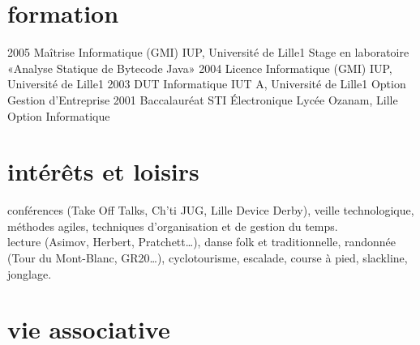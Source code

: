 \documentclass[print]{cv} %
\begin{document}
\section{formation}

\begin{entrylist}
\entry
{2005}
{Maîtrise {\normalfont Informatique (GMI)}}
{IUP, Université de Lille1}
{Stage en laboratoire «Analyse Statique de Bytecode Java»}
\entry
{2004}
{Licence {\normalfont Informatique (GMI)}}
{IUP, Université de Lille1}
{}
\entry
{2003}
{DUT {\normalfont Informatique}}
{IUT A, Université de Lille1}
{Option Gestion d'Entreprise}
\entry
{2001}
{Baccalauréat {\normalfont STI Électronique}}
{Lycée Ozanam, Lille}
{Option Informatique}
\end{entrylist}

\par\vspace{5\parskip}
\section{intérêts et loisirs}

\textbf{} conférences (Take Off Talks, Ch'ti JUG, Lille Device Derby), veille technologique, méthodes agiles, techniques d'organisation et de gestion du temps.
\vspace{10pt}\\
\textbf{} lecture (Asimov, Herbert, Pratchett…), danse folk et traditionnelle, randonnée (Tour du Mont-Blanc, GR20…), cyclotourisme, escalade, course à pied, slackline, jonglage.

\par\vspace{50\parskip}
\section{vie associative}
\end{document}
